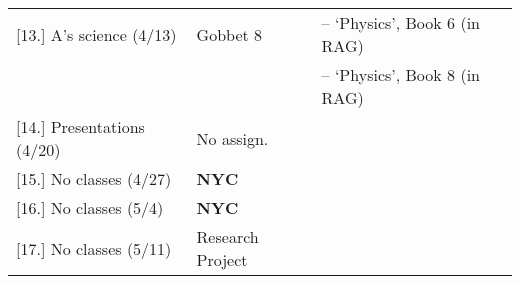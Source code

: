 \documentclass[article,oneside]{memoir}
\begin{document}
\begin{center}
\begin{longtable}{p{4.5cm}p{2cm}p{4.5cm}}
[13.] A's science  (4/13)			& Gobbet 8			& -- `Physics', Book 6 (in RAG) \\ 
			    				& 					& -- `Physics', Book 8 (in RAG) \\ [1.8\baselineskip] \hline

[14.] Presentations (4/20)			& No assign.			&  \\ [1.8\baselineskip] \hline
												 
[15.] No classes (4/27)			& \textbf{NYC} & \\  [1.8\baselineskip] \hline

[16.] No classes (5/4)			&  \textbf{NYC}	& \\ [1.8\baselineskip] \hline
	
[17.] No classes (5/11)			& Research Project 	& \\ [1.8\baselineskip] \hline

\end{longtable}
\end{center}
\end{document}
